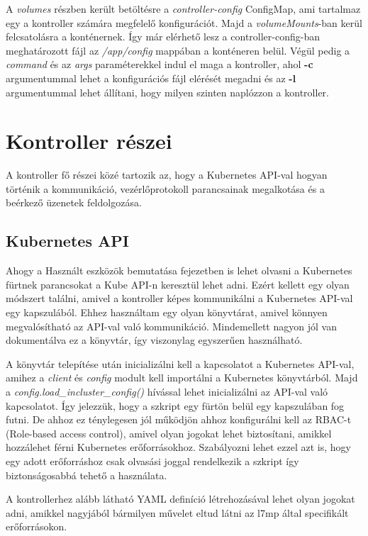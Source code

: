 A \textit{volumes} részben került betöltésre a \textit{controller-config} ConfigMap, ami 
tartalmaz egy a kontroller számára megfelelő konfigurációt. Majd a \textit{volumeMounts}-ban
kerül felcsatolásra a konténernek. Így már elérhető lesz a controller-config-ban meghatározott
fájl az \textit{/app/config} mappában a konténeren belül. Végül pedig a \textit{command} és az
\textit{args} paraméterekkel indul el maga a kontroller, ahol \textbf{-c} argumentummal 
lehet a konfigurációs fájl elérését megadni és az \textbf{-l} argumentummal lehet állítani,
hogy milyen szinten naplózzon a kontroller.

\section{Kontroller részei}

A kontroller fő részei közé tartozik az, hogy a Kubernetes API-val 
hogyan történik a kommunikáció, vezérlőprotokoll parancsainak megalkotása és
a beérkező üzenetek feldolgozása. 

\subsection{Kubernetes API}

Ahogy a Használt eszközök bemutatása fejezetben is lehet olvasni a Kubernetes
fürtnek parancsokat a Kube API-n keresztül lehet adni. Ezért kellett egy olyan
módszert találni, amivel a kontroller képes kommunikálni a Kubernetes API-val 
egy kapszulából. Ehhez használtam egy olyan könyvtárat, amivel
könnyen megvalósítható az API-val való kommunikáció. Mindemellett nagyon jól
van dokumentálva ez a könyvtár, így viszonylag egyszerűen használható.

A könyvtár telepítése után inicializálni kell a kapcsolatot a Kubernetes 
API-val, amihez a \textit{client} és \textit{config} modult kell importálni
a Kubernetes könyvtárból. Majd a \textit{config.load\_incluster\_config()}
hívással lehet inicializálni az API-val való kapcsolatot. Így jelezzük, hogy a
szkript egy fürtön belül egy kapszulában fog futni. De ahhoz ez ténylegesen jól 
működjön ahhoz konfigurálni kell az RBAC-t (Role-based access control), amivel 
olyan jogokat lehet biztosítani, amikkel hozzálehet férni Kubernetes 
erőforrásokhoz. Szabályozni lehet ezzel azt is, hogy egy adott erőforráshoz 
csak olvasási joggal rendelkezik a szkript így biztonságosabbá tehető a használata.

A kontrollerhez alább látható YAML definíció létrehozásával lehet olyan jogokat
adni, amikkel nagyjából bármilyen művelet eltud látni az l7mp által specifikált 
erőforrásokon.


